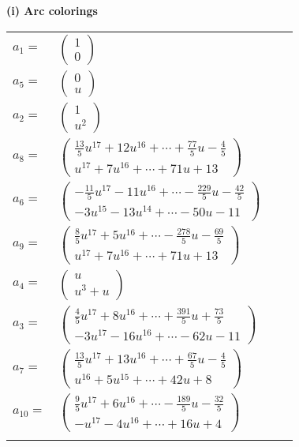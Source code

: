 \documentclass[1p]{elsarticle_modified}
\theoremstyle{definition}
\begin{document}
\flushleft \textbf{(i) Arc colorings}\\
\begin{tabular}{m{7pt} m{180pt} m{7pt} m{180pt} }
\flushright $a_{1}=$&$\begin{pmatrix}1\\0\end{pmatrix}$ \\
\flushright $a_{5}=$&$\begin{pmatrix}0\\u\end{pmatrix}$ \\
\flushright $a_{2}=$&$\begin{pmatrix}1\\u^2\end{pmatrix}$ \\
\flushright $a_{8}=$&$\begin{pmatrix}\frac{13}{5} u^{17}+12 u^{16}+\cdots+\frac{77}{5} u-\frac{4}{5}\\u^{17}+7 u^{16}+\cdots+71 u+13\end{pmatrix}$ \\
\flushright $a_{6}=$&$\begin{pmatrix}-\frac{11}{5} u^{17}-11 u^{16}+\cdots-\frac{229}{5} u-\frac{42}{5}\\-3 u^{15}-13 u^{14}+\cdots-50 u-11\end{pmatrix}$ \\
\flushright $a_{9}=$&$\begin{pmatrix}\frac{8}{5} u^{17}+5 u^{16}+\cdots-\frac{278}{5} u-\frac{69}{5}\\u^{17}+7 u^{16}+\cdots+71 u+13\end{pmatrix}$ \\
\flushright $a_{4}=$&$\begin{pmatrix}u\\u^3+u\end{pmatrix}$ \\
\flushright $a_{3}=$&$\begin{pmatrix}\frac{4}{5} u^{17}+8 u^{16}+\cdots+\frac{391}{5} u+\frac{73}{5}\\-3 u^{17}-16 u^{16}+\cdots-62 u-11\end{pmatrix}$ \\
\flushright $a_{7}=$&$\begin{pmatrix}\frac{13}{5} u^{17}+13 u^{16}+\cdots+\frac{67}{5} u-\frac{4}{5}\\u^{16}+5 u^{15}+\cdots+42 u+8\end{pmatrix}$ \\
\flushright $a_{10}=$&$\begin{pmatrix}\frac{9}{5} u^{17}+6 u^{16}+\cdots-\frac{189}{5} u-\frac{32}{5}\\- u^{17}-4 u^{16}+\cdots+16 u+4\end{pmatrix}$\\&\end{tabular}
\end{document}
